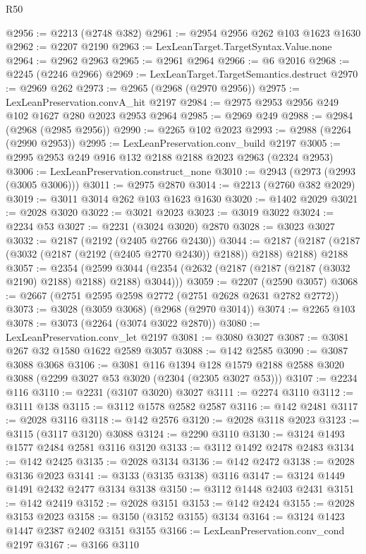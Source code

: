 \begin{lexlean}{R50}
\begin{coremodule}
@2956 := @2213 (@2748 @382)
@2961 := @2954 @2956 @262 @103 @1623 @1630
@2962 := @2207 @2190
@2963 := LexLeanTarget.TargetSyntax.Value.none
@2964 := @2962 @2963
@2965 := @2961 @2964
@2966 := @6 @2016
@2968 := @2245 (@2246 @2966)
@2969 := LexLeanTarget.TargetSemantics.destruct
@2970 := @2969 @262
@2973 := @2965 (@2968 (@2970 @2956))
@2975 := LexLeanPreservation.convA_hit @2197
@2984 := @2975 @2953 @2956 @249 @102 @1627 @280 @2023 @2953 @2964
@2985 := @2969 @249
@2988 := @2984 (@2968 (@2985 @2956))
@2990 := @2265 @102 @2023
@2993 := @2988 (@2264 (@2990 @2953))
@2995 := LexLeanPreservation.conv_build @2197
@3005 := @2995 @2953 @249 @916 @132 @2188 @2188 @2023 @2963 (@2324 @2953)
@3006 := LexLeanPreservation.construct_none
@3010 := @2943 (@2973 (@2993 (@3005 @3006)))
@3011 := @2975 @2870
@3014 := @2213 (@2760 @382 @2029)
@3019 := @3011 @3014 @262 @103 @1623 @1630
@3020 := @1402 @2029
@3021 := @2028 @3020
@3022 := @3021 @2023
@3023 := @3019 @3022
@3024 := @2234 @53
@3027 := @2231 (@3024 @3020) @2870
@3028 := @3023 @3027
@3032 := @2187 (@2192 (@2405 @2766 @2430))
@3044 := @2187 (@2187 (@2187 (@3032 (@2187 (@2192 (@2405 @2770 @2430)) @2188)) @2188) @2188) @2188
@3057 := @2354
    (@2599 @3044 (@2354 (@2632 (@2187 (@2187 (@2187 (@3032 @2190) @2188) @2188) @2188) @3044)))
@3059 := @2207 (@2590 @3057)
@3068 := @2667 (@2751 @2595 @2598 @2772 (@2751 @2628 @2631 @2782 @2772))
@3073 := @3028 (@3059 @3068) (@2968 (@2970 @3014))
@3074 := @2265 @103
@3078 := @3073 (@2264 (@3074 @3022 @2870))
@3080 := LexLeanPreservation.conv_let @2197
@3081 := @3080 @3027
@3087 := @3081 @267 @32 @1580 @1622 @2589 @3057
@3088 := @142 @2585
@3090 := @3087 @3088 @3068
@3106 := @3081
    @116
    @1394
    @128
    @1579
    @2188
    @2588
    @3020
    @3088
    (@2299 @3027 @53 @3020 (@2304 (@2305 @3027 @53)))
@3107 := @2234 @116
@3110 := @2231 (@3107 @3020) @3027
@3111 := @2274 @3110
@3112 := @3111 @138
@3115 := @3112 @1578 @2582 @2587
@3116 := @142 @2481
@3117 := @2028 @3116
@3118 := @142 @2576
@3120 := @2028 @3118 @2023
@3123 := @3115 (@3117 @3120) @3088
@3124 := @2290 @3110
@3130 := @3124 @1493 @1577 @2484 @2581 @3116 @3120
@3133 := @3112 @1492 @2478 @2483
@3134 := @142 @2425
@3135 := @2028 @3134
@3136 := @142 @2472
@3138 := @2028 @3136 @2023
@3141 := @3133 (@3135 @3138) @3116
@3147 := @3124 @1449 @1491 @2432 @2477 @3134 @3138
@3150 := @3112 @1448 @2403 @2431
@3151 := @142 @2419
@3152 := @2028 @3151
@3153 := @142 @2424
@3155 := @2028 @3153 @2023
@3158 := @3150 (@3152 @3155) @3134
@3164 := @3124 @1423 @1447 @2387 @2402 @3151 @3155
@3166 := LexLeanPreservation.conv_cond @2197
@3167 := @3166 @3110

\end{coremodule}
\end{lexlean}
